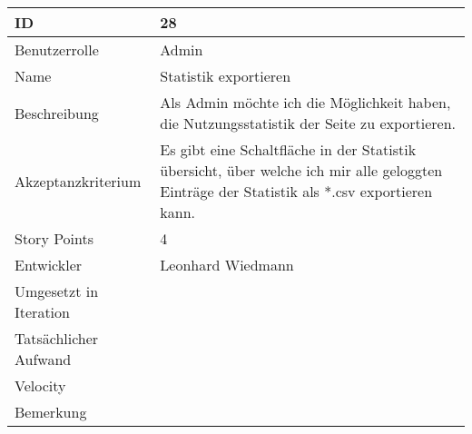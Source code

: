 \begin{tabularx}{\textwidth}{|p{}|X|}
	\hline
	ID & 28 \\
	\hline
	Benutzerrolle & Admin \\
	\hline
	Name & Statistik exportieren\\
	\hline
	Beschreibung & Als Admin möchte ich die Möglichkeit haben, die Nutzungsstatistik der Seite zu exportieren. \\
	\hline
	Akzeptanzkriterium & Es gibt eine Schaltfläche in der Statistik übersicht, über welche ich mir alle geloggten Einträge der Statistik als *.csv exportieren kann. \\
	\hline
	Story Points & 4 \\
	\hline
	Entwickler & Leonhard Wiedmann \\
	\hline
	Umgesetzt in Iteration & \\
	\hline
	Tatsächlicher Aufwand & \\
	\hline
	Velocity & \\
	\hline
	Bemerkung & \\
	\hline
\end{tabularx}
\vspace{20pt}
